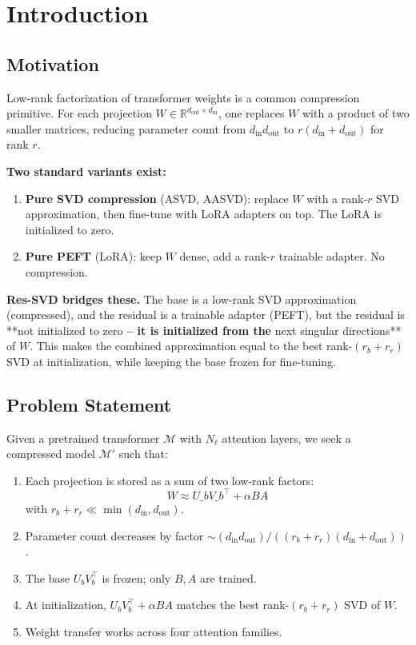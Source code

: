 \section{Introduction}

\subsection{Motivation}

Low-rank factorization of transformer weights is a common compression 
primitive. For each projection $W \in \mathbb{R}^{d_\text{out} \times d_\text{in}}$, 
one replaces $W$ with a product of two smaller matrices, reducing parameter 
count from $d_\text{in} d_\text{out}$ to $r(d_\text{in} + d_\text{out})$ 
for rank $r$.

\textbf{Two standard variants exist:}

\begin{enumerate}
\item \textbf{Pure SVD compression} (ASVD, AASVD): replace $W$ with a rank-$r$ SVD
  approximation, then fine-tune with LoRA adapters on top. The LoRA is
  initialized to zero.
\item \textbf{Pure PEFT} (LoRA): keep $W$ dense, add a rank-$r$ trainable adapter.
  No compression.

\end{enumerate}
\textbf{Res-SVD bridges these.} The base is a low-rank SVD approximation (compressed), 
and the residual is a trainable adapter (PEFT), but the residual is **not 
initialized to zero\textbf{ -- it is initialized from the }next singular directions** 
of $W$. This makes the combined approximation equal to the best rank-$(r_b + r_r)$ 
SVD at initialization, while keeping the base frozen for fine-tuning.

\subsection{Problem Statement}

Given a pretrained transformer $\mathcal{M}$ with $N_\ell$ attention layers, 
we seek a compressed model $\mathcal{M}'$ such that:

\begin{enumerate}
\item Each projection is stored as a sum of two low-rank factors:
  $$
  W \approx U\_b V\_b^\top + \alpha B A
  \tag{1.1}
  $$
  with $r_b + r_r \ll \min(d_\text{in}, d_\text{out})$.
\item Parameter count decreases by factor $\sim (d_\text{in} d_\text{out}) / ((r_b + r_r)(d_\text{in} + d_\text{out}))$.
\item The base $U_b V_b^\top$ is frozen; only $B, A$ are trained.
\item At initialization, $U_b V_b^\top + \alpha B A$ matches the best rank-$(r_b + r_r)$
  SVD of $W$.
\item Weight transfer works across four attention families.

\end{enumerate}
